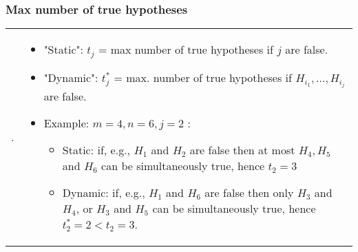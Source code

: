 \documentclass[bigger]{beamer}
\begin{document}
\begin{frame}
\frametitle{Max number of true hypotheses}
\begin{tabular}{ll}
  \begin{minipage}{.4\textwidth}
   
.
  \end{minipage} &
  \begin{minipage}{.6\textwidth}
  \begin{itemize}
  \item "Static":  $t_j$ = max number of true hypotheses if $j$ are false.
  \item "Dynamic": $t^*_j $ = max. number of true hypotheses if $H_{i_1},...,H_{i_j}$ are false.
  \item Example: $m=4, n=6, j = 2$ :
    \begin{itemize}
      \item  {Static: if, e.g., $H_1$ and $H_2$ are false then at most $H_4, H_5 $ and $H_6$ can be simultaneously true, hence $t_2 = 3$}
      \item  {Dynamic: if, e.g., $H_1$ and $H_6$ are false then only $H_3$ and $H_4$, or $H_3$ and $H_5$ can be simultaneously true, hence $t^*_2 = 2 < t_2 =3$.}
      \end{itemize}
      
\end{itemize} %
  \end{minipage}
\end{tabular}
\end{frame}
%
%
%
%
%
%
%
%
\end{document}
